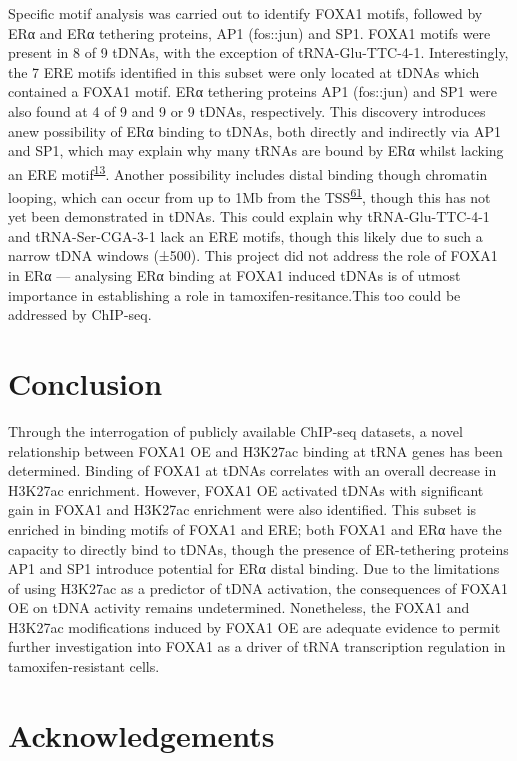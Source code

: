 \documentclass[
  12pt,
]{article}
\begin{document}
Specific motif analysis was carried out to identify FOXA1 motifs, followed by ERα and ERα tethering proteins, AP1 (fos::jun) and SP1.
FOXA1 motifs were present in 8 of 9 tDNAs, with the exception of tRNA-Glu-TTC-4-1.
Interestingly, the 7 ERE motifs identified in this subset were only located at tDNAs which contained a FOXA1 motif.
ERα tethering proteins AP1 (fos::jun) and SP1 were also found at 4 of 9 and 9 or 9 tDNAs, respectively.
This discovery introduces anew possibility of ERα binding to tDNAs, both directly and indirectly via AP1 and SP1, which may explain why many tRNAs are bound by ERα whilst lacking an ERE motif\textsuperscript{\protect\hyperlink{ref-malcolm2022}{13}}.
Another possibility includes distal binding though chromatin looping, which can occur from up to 1Mb from the TSS\textsuperscript{\protect\hyperlink{ref-fullwood2009}{61}}, though this has not yet been demonstrated in tDNAs.
This could explain why tRNA-Glu-TTC-4-1 and tRNA-Ser-CGA-3-1 lack an ERE motifs, though this likely due to such a narrow tDNA windows (±500).
This project did not address the role of FOXA1 in ERα --- analysing ERα binding at FOXA1 induced tDNAs is of utmost importance in establishing a role in tamoxifen-resitance.This too could be addressed by ChIP-seq.

\hypertarget{conclusion}{%
\section{Conclusion}\label{conclusion}}

Through the interrogation of publicly available ChIP-seq datasets, a novel relationship between FOXA1 OE and H3K27ac binding at tRNA genes has been determined.
Binding of FOXA1 at tDNAs correlates with an overall decrease in H3K27ac enrichment.
However, FOXA1 OE activated tDNAs with significant gain in FOXA1 and H3K27ac enrichment were also identified.
This subset is enriched in binding motifs of FOXA1 and ERE; both FOXA1 and ERα have the capacity to directly bind to tDNAs, though the presence of ER-tethering proteins AP1 and SP1 introduce potential for ERα distal binding.
Due to the limitations of using H3K27ac as a predictor of tDNA activation, the consequences of FOXA1 OE on tDNA activity remains undetermined.
Nonetheless, the FOXA1 and H3K27ac modifications induced by FOXA1 OE are adequate evidence to permit further investigation into FOXA1 as a driver of tRNA transcription regulation in tamoxifen-resistant cells.

\hypertarget{acknowledgements}{%
\section{Acknowledgements}\label{acknowledgements}}
\end{document}
